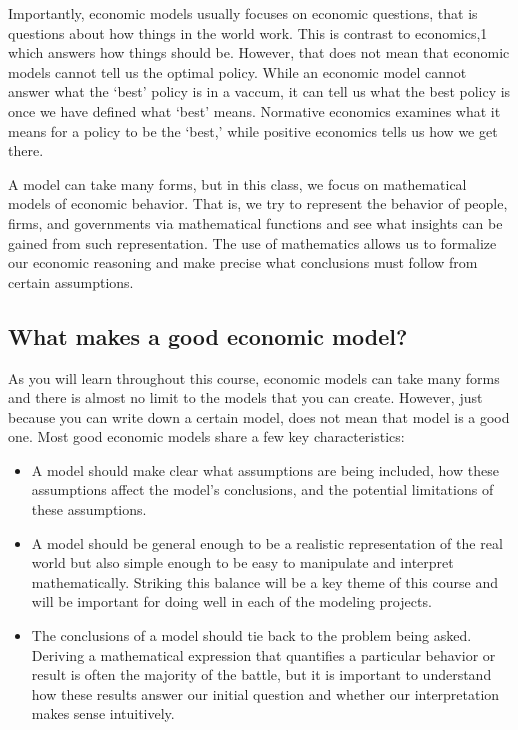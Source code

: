 Importantly, economic models usually focuses on  economic questions, that is questions about how things in the world work. This is contrast to  economics,1 which answers how things should be. However, that does not mean that economic models cannot tell us the optimal policy. While an economic model cannot answer what the `best' policy is in a vaccum, it can tell us what the best policy is once we have defined what `best' means. Normative economics examines what it means for a policy to be the `best,' while positive economics tells us how we get there.

A model can take many forms, but in this class, we focus on mathematical models of economic behavior. That is, we try to represent the behavior of people, firms, and governments via mathematical functions and see what insights can be gained from such representation. The use of mathematics allows us to formalize our economic reasoning and make precise what conclusions must follow from certain assumptions. 

\subsection*{What makes a good economic model?}
As you will learn throughout this course, economic models can take many forms and there is almost no limit to the models that you can create. However, just because you can write down a certain model, does not mean that model is a good one. Most good economic models share a few key characteristics:
\begin{itemize}
    \item A model should make clear what assumptions are being included, how these assumptions affect the model's conclusions, and the potential limitations of these assumptions.
    \item A model should be general enough to be a realistic representation of the real world but also simple enough to be easy to manipulate and interpret mathematically. Striking this balance will be a key theme of this course and will be important for doing well in each of the modeling projects.
    \item The conclusions of a model should tie back to the problem being asked. Deriving a mathematical expression that quantifies a particular behavior or result is often the majority of the battle, but it is important to understand how these results answer our initial question and whether our interpretation makes sense intuitively.
\end{itemize}

